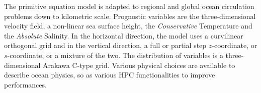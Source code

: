 


The primitive equation model is adapted to regional and global ocean circulation problems down to
kilometric scale.
Prognostic variables are the three-dimensional velocity field, a non-linear sea surface height,
the \textit{Conservative} Temperature and the \textit{Absolute} Salinity.
In the horizontal direction, the model uses a curvilinear orthogonal grid and
in the vertical direction, a full or partial step $z$-coordinate, or $s$-coordinate, or
a mixture of the two.
The distribution of variables is a three-dimensional Arakawa C-type grid.
Various physical choices are available to describe ocean physics,
so as various HPC functionalities to improve performances.
